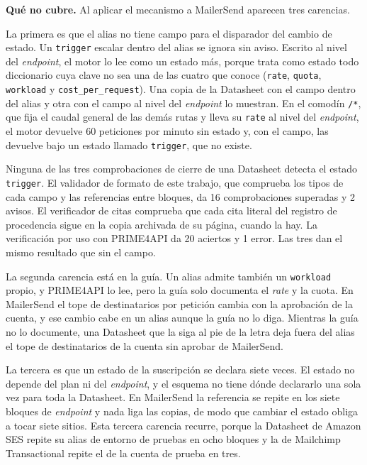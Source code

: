 \textbf{Qué no cubre.} Al aplicar el mecanismo a MailerSend aparecen tres carencias.

La primera es que el alias no tiene campo para el disparador del cambio de estado.
Un \texttt{trigger} escalar dentro del alias se ignora sin aviso.
Escrito al nivel del \textit{endpoint}, el motor lo lee como un estado más, porque trata como estado todo diccionario cuya clave no sea una de las cuatro que conoce (\texttt{rate}, \texttt{quota}, \texttt{workload} y \texttt{cost\_per\_request}).
Una copia de la Datasheet con el campo dentro del alias y otra con el campo al nivel del \textit{endpoint} lo muestran.
En el comodín \texttt{/*}, que fija el caudal general de las demás rutas y lleva su \texttt{rate} al nivel del \textit{endpoint}, el motor devuelve 60 peticiones por minuto sin estado y, con el campo, las devuelve bajo un estado llamado \texttt{trigger}, que no existe.

Ninguna de las tres comprobaciones de cierre de una Datasheet detecta el estado \texttt{trigger}.
El validador de formato de este trabajo, que comprueba los tipos de cada campo y las referencias entre bloques, da 16 comprobaciones superadas y 2 avisos.
El verificador de citas comprueba que cada cita literal del registro de procedencia sigue en la copia archivada de su página, cuando la hay.
La verificación por uso con PRIME4API da 20 aciertos y 1 error.
Las tres dan el mismo resultado que sin el campo.

La segunda carencia está en la guía.
Un alias admite también un \texttt{workload} propio, y PRIME4API lo lee, pero la guía solo documenta el \textit{rate} y la cuota.
En MailerSend el tope de destinatarios por petición cambia con la aprobación de la cuenta, y ese cambio cabe en un alias aunque la guía no lo diga.
Mientras la guía no lo documente, una Datasheet que la siga al pie de la letra deja fuera del alias el tope de destinatarios de la cuenta sin aprobar de MailerSend.

La tercera es que un estado de la suscripción se declara siete veces.
El estado no depende del plan ni del \textit{endpoint}, y el esquema no tiene dónde declararlo una sola vez para toda la Datasheet.
En MailerSend la referencia se repite en los siete bloques de \textit{endpoint} y nada liga las copias, de modo que cambiar el estado obliga a tocar siete sitios.
Esta tercera carencia recurre, porque la Datasheet de Amazon SES repite su alias de entorno de pruebas en ocho bloques y la de Mailchimp Transactional repite el de la cuenta de prueba en tres.

